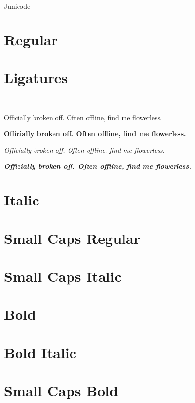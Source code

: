 \documentclass{article}
\begin{document}
\begin{center}
\huge{\jExp Junicode}
\end{center}

\section*{Regular}

\lipsum[1]

\section*{Ligatures}

\ 

Officially broken off. Often offline, find me flowerless.

\textbf{Officially broken off. Often offline, find me flowerless.}

\textit{Officially broken off. Often offline, find me flowerless.}

\textbf{\textit{Officially broken off. Often offline, find me flowerless.}}

\section*{Italic}
\textit{\lipsum[2]}

\section*{Small Caps Regular}
\textsc{\lipsum[5]}

\section*{Small Caps Italic}
\textsc{\textit{\lipsum[6]}}

\section*{Bold}
\textbf{\lipsum[3]}

\section*{Bold Italic}
\textbf{\emph{\lipsum[4]}}


\section*{Small Caps Bold}
\textbf{\textsc{\lipsum[5]}}
\end{document}
